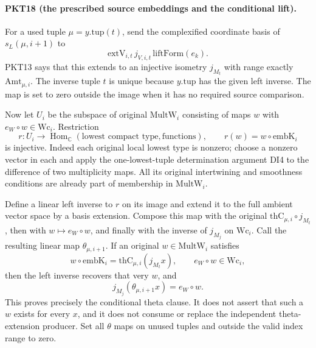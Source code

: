 \paragraph{PKT18 (the prescribed source embeddings and the conditional lift).}\label{claim:PKT18}
For a used tuple $\mu=y.\mathrm{tup}(t)$, send the complexified coordinate
basis of $s_L(\mu,i+1)$ to
\[
 \mathrm{extV}_{i,t}\,j_{V,i,t}\,\mathrm{liftForm}(e_k).
\]
PKT13 says that this extends to an injective isometry $j_{M_t}$ with
range exactly $\mathrm{Amt}_{\mu,i}$.  The inverse tuple $t$ is unique
because $y.\mathrm{tup}$ has the given left inverse.  The map is set to
zero outside the image when it has no required source comparison.

Now let $U_i$ be the subspace of original $\mathrm{MultW}_i$ consisting
of maps $w$ with $e_W\circ w\in\mathrm{Wc}_i$.  Restriction
\[
 r:U_i\longrightarrow\operatorname{Hom}_{\mathbb C}
       (\text{lowest compact type},\text{functions}),
 \qquad r(w)=w\circ\mathrm{embK}_i
 \tag{PKT.21}
\]
is injective.  Indeed each original local lowest type is nonzero; choose a
nonzero vector in each and apply the one-lowest-tuple determination argument
DI4 to the difference of two multiplicity maps.  All its original
intertwining and smoothness conditions are already part of membership in
$\mathrm{MultW}_i$.

Define a linear left inverse to $r$ on its image and extend it to the full
ambient vector space by a basis extension.  Compose this map with the
original $\mathrm{thC}_{\mu,i}\circ j_{M_t}$, then with
$w\mapsto e_W\circ w$, and finally with the inverse of $j_{M_j}$ on
$\mathrm{Wc}_i$.  Call the resulting linear map $\theta_{\mu,i+1}$.
If an original $w\in\mathrm{MultW}_i$ satisfies
\[
 w\circ\mathrm{embK}_i=\mathrm{thC}_{\mu,i}(j_{M_t}x),
 \qquad e_W\circ w\in\mathrm{Wc}_i,
\]
then the left inverse recovers that very $w$, and
\[
 j_{M_j}(\theta_{\mu,i+1}x)=e_W\circ w.\tag{PKT.22}
\]
This proves precisely the conditional theta clause.  It does not assert
that such a $w$ exists for every $x$, and it does not consume or replace
the independent theta-extension producer.  Set all $\theta$ maps on unused
tuples and outside the valid index range to zero.

